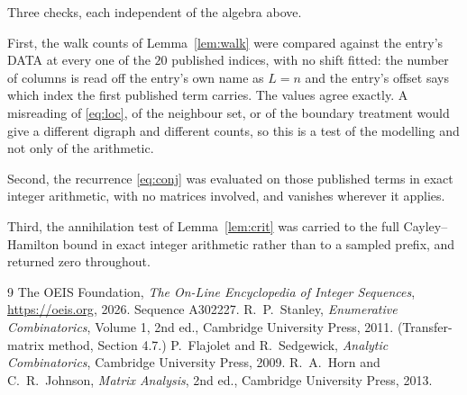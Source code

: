 \documentclass[11pt,a4paper]{article}
\theoremstyle{plain}
\theoremstyle{definition}
\begin{document}
Three checks, each independent of the algebra above.

First, the walk counts of Lemma~\ref{lem:walk} were compared against the entry's DATA at
every one of the $20$ published indices, with no shift fitted: the number of columns is
read off the entry's own name as $L=n$ and the entry's offset says which index the first
published term carries. The values agree exactly. A misreading of \eqref{eq:loc}, of the
neighbour set, or of the boundary treatment would give a different digraph and different
counts, so this is a test of the modelling and not only of the arithmetic.

Second, the recurrence \eqref{eq:conj} was evaluated on those published terms in exact
integer arithmetic, with no matrices involved, and vanishes wherever it applies.

Third, the annihilation test of Lemma~\ref{lem:crit} was carried to the full
Cayley--Hamilton bound in exact integer arithmetic rather than to a sampled prefix, and
returned zero throughout.

\begin{thebibliography}{9}
 The OEIS Foundation, \emph{The On-Line Encyclopedia of Integer
Sequences}, \url{https://oeis.org}, 2026. Sequence A302227.
 R.~P.~Stanley, \emph{Enumerative Combinatorics}, Volume 1, 2nd ed.,
Cambridge University Press, 2011. (Transfer-matrix method, Section 4.7.)
 P.~Flajolet and R.~Sedgewick, \emph{Analytic Combinatorics}, Cambridge
University Press, 2009.
 R.~A.~Horn and C.~R.~Johnson, \emph{Matrix Analysis}, 2nd ed., Cambridge
University Press, 2013.
\end{thebibliography}
\end{document}
